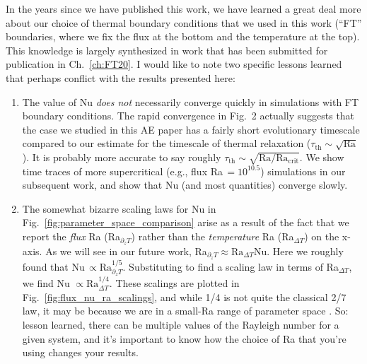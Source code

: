 In the years since we have published this work, we have learned a great deal more about our choice of thermal boundary conditions that we used in this work (``FT'' boundaries, where we fix the flux at the bottom and the temperature at the top).
This knowledge is largely synthesized in work that has been submitted for publication in Ch.~\ref{ch:FT20}.
I would like to note two specific lessons learned that perhaps conflict with the results presented here:
\begin{enumerate}
\item The value of Nu \emph{does not} necessarily converge quickly in simulations with FT boundary conditions.
The rapid convergence in Fig.~2 actually suggests that the case we studied in this AE paper has a fairly short evolutionary timescale compared to our estimate for the timescale of thermal relaxation ($\tau_{\text{th}} \sim \sqrt{\text{Ra}}$).
It is probably more accurate to say roughly $\tau_{\text{th}} \sim \sqrt{\text{Ra}/\text{Ra}_{\text{crit}}}$.
We show time traces of more supercritical (e.g., flux Ra$\,= 10^{10.5}$) simulations in our subsequent work, and show that Nu (and most quantities) converge slowly.
\item The somewhat bizarre scaling laws for Nu in Fig.~\ref{fig:parameter_space_comparison} arise as a result of the fact that we report the \emph{flux} Ra (Ra$_{\partial_z T}$) rather than the \emph{temperature} Ra (Ra$_{\Delta T}$) on the x-axis.
As we will see in our future work, Ra$_{\partial_z T} \approx \text{Ra}_{\Delta T} \text{Nu}$. 
Here we roughly found that Nu$\,\propto \text{Ra}_{\partial_z T}^{1/5}$.
Substituting to find a scaling law in terms of Ra$_{\Delta T}$, we find Nu $\propto \text{Ra}_{\Delta T}^{1/4}$.
These scalings are plotted in Fig.~\ref{fig:flux_nu_ra_scalings}, and while 1/4 is not quite the classical 2/7 law, it may be because we are in a small-Ra range of parameter space \citep{johnston&doering2009}.
So: lesson learned, there can be multiple values of the Rayleigh number for a given system, and it's important to know how the choice of Ra that you're using changes your results.
\end{enumerate}


